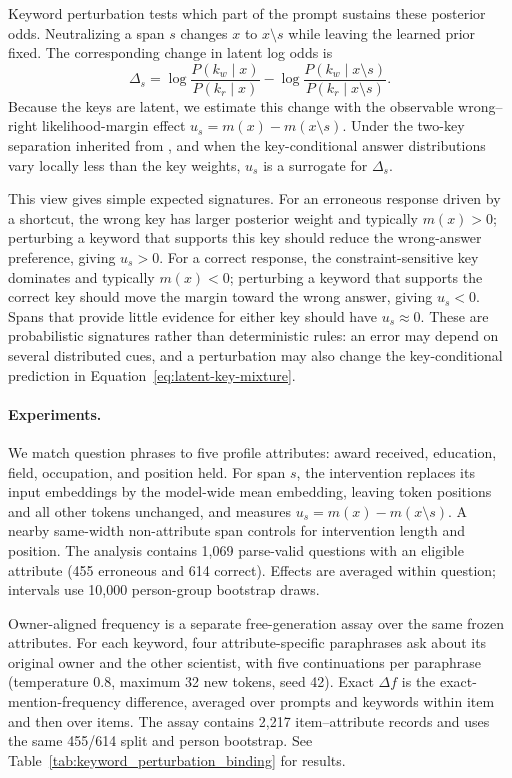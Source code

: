 Keyword perturbation tests which part of the prompt sustains these posterior
odds.  Neutralizing a span $s$ changes $x$ to $x\setminus s$ while leaving the
learned prior fixed.  The corresponding change in latent log odds is
\begin{equation}
\Delta_s=
\log\frac{P(k_w\mid x)}{P(k_r\mid x)}
-
\log\frac{P(k_w\mid x\setminus s)}{P(k_r\mid x\setminus s)}.
\label{eq:key-odds-perturbation}
\end{equation}
Because the keys are latent, we estimate this change with the observable
wrong--right likelihood-margin effect $u_s=m(x)-m(x\setminus s)$.  Under the
two-key separation inherited from \citet{hu2026reasoningpriors}, and when the
key-conditional answer distributions vary locally less than the key weights,
$u_s$ is a surrogate for $\Delta_s$.

This view gives simple expected signatures.  For an erroneous response driven
by a shortcut, the wrong key has larger posterior weight and typically
$m(x)>0$; perturbing a keyword that supports this key should reduce the
wrong-answer preference, giving $u_s>0$.  For a correct response, the
constraint-sensitive key dominates and typically $m(x)<0$; perturbing a
keyword that supports the correct key should move the margin toward the wrong
answer, giving $u_s<0$.  Spans that provide little evidence for either key
should have $u_s\approx0$.  These are probabilistic signatures rather than
deterministic rules: an error may depend on several distributed cues, and a
perturbation may also change the key-conditional prediction in
Equation~\ref{eq:latent-key-mixture}.

\paragraph{Experiments.}
We match question phrases to five profile attributes: award received,
education, field, occupation, and position held. For span $s$, the intervention
replaces its input embeddings by the model-wide mean embedding, leaving token
positions and all other tokens unchanged, and measures
$u_s=m(x)-m(x\setminus s)$. A nearby same-width non-attribute span controls for
intervention length and position. The analysis contains 1,069 parse-valid
questions with an eligible attribute (455 erroneous and 614 correct). Effects
are averaged within question; intervals use 10,000 person-group bootstrap draws.

Owner-aligned frequency is a separate free-generation assay over the same
frozen attributes. For each keyword, four attribute-specific paraphrases ask
about its original owner and the other scientist, with five continuations per
paraphrase (temperature 0.8, maximum 32 new tokens, seed 42). Exact $\Delta f$
is the exact-mention-frequency difference, averaged over prompts and keywords
within item and then over items. The assay contains 2,217 item--attribute
records and uses the same 455/614 split and person bootstrap. See Table~\ref{tab:keyword_perturbation_binding} for results.


